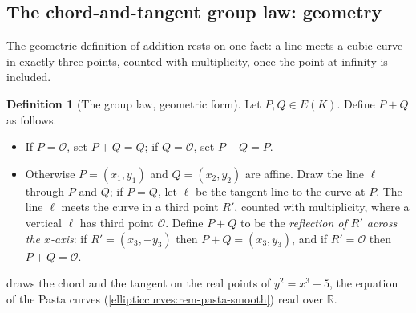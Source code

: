 \documentclass[11pt,a4paper]{article}
\theoremstyle{definition}
\newtheorem{definition}[theorem]{Definition}
\theoremstyle{remark}
\newcommand{\R}{\ensuremath{\mathbb{R}}}
\begin{document}
\subsection{The chord-and-tangent group law: geometry}
\label{ellipticcurves:subsec-grouplaw-geom}

The geometric definition of addition rests on one fact: a line meets a
cubic curve in exactly three points, counted with multiplicity, once the
point at infinity is included.

\begin{definition}[The group law, geometric form]
\label{ellipticcurves:def-grouplaw-geom}
Let \(P, Q \in E(K)\). Define \(P + Q\) as follows.
\begin{itemize}
  \item If \(P = \mathcal{O}\), set \(P + Q = Q\); if
    \(Q = \mathcal{O}\), set \(P + Q = P\).
  \item Otherwise \(P = (x_1, y_1)\) and \(Q = (x_2, y_2)\) are affine.
    Draw the line \(\ell\) through \(P\) and \(Q\); if \(P = Q\), let
    \(\ell\) be the tangent line to the curve at \(P\). The line
    \(\ell\) meets the curve in a third point \(R'\), counted with
    multiplicity, where a vertical \(\ell\) has third point
    \(\mathcal{O}\). Define \(P + Q\) to be the \emph{reflection of
    \(R'\) across the \(x\)-axis}: if \(R' = (x_3, -y_3)\) then
    \(P + Q = (x_3, y_3)\), and if \(R' = \mathcal{O}\) then
    \(P + Q = \mathcal{O}\).
\end{itemize}
\end{definition}

 draws the chord and the tangent
on the real points of \(y^2 = x^3 + 5\), the equation of the Pasta curves
(\cref{ellipticcurves:rem-pasta-smooth}) read over \(\R\).
\end{document}
